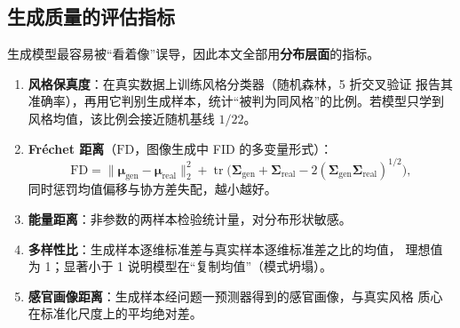 \subsection{生成质量的评估指标}

生成模型最容易被“看着像”误导，因此本文全部用\textbf{分布层面}的指标。

\begin{enumerate}[label=(\arabic*),leftmargin=2.2em,itemsep=1pt]
\item \textbf{风格保真度}：在真实数据上训练风格分类器（随机森林，5 折交叉验证
  报告其准确率），再用它判别生成样本，统计“被判为同风格”的比例。若模型只学到
  风格均值，该比例会接近随机基线 $1/22$。
\item \textbf{Fréchet 距离}（$\mathrm{FD}$，图像生成中 FID 的多变量形式）：
  \begin{equation}
  \mathrm{FD}=\|\bm{\mu}_{\mathrm{gen}}-\bm{\mu}_{\mathrm{real}}\|_2^2
  +\operatorname{tr}\Big(\bm{\Sigma}_{\mathrm{gen}}+\bm{\Sigma}_{\mathrm{real}}
  -2(\bm{\Sigma}_{\mathrm{gen}}\bm{\Sigma}_{\mathrm{real}})^{1/2}\Big),
  \label{eq:fd}
  \end{equation}
  同时惩罚均值偏移与协方差失配，越小越好。
\item \textbf{能量距离}：非参数的两样本检验统计量，对分布形状敏感。
\item \textbf{多样性比}：生成样本逐维标准差与真实样本逐维标准差之比的均值，
  理想值为 1；显著小于 1 说明模型在“复制均值”（模式坍塌）。
\item \textbf{感官画像距离}：生成样本经问题一预测器得到的感官画像，与真实风格
  质心在标准化尺度上的平均绝对差。
\end{enumerate}
